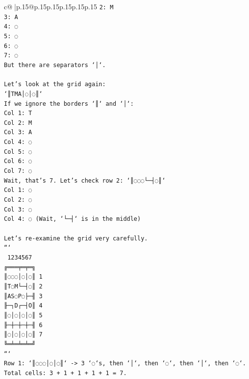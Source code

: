 \documentclass{article}
\begin{document}
{\begin{supertabular}{c@{$\;$}|p{.15\linewidth}@{}p{.15\linewidth}p{.15\linewidth}p{.15\linewidth}p{.15\linewidth}p{.15\linewidth}}
{{{\texttt{2: M} \\
\texttt{3: A} \\
\texttt{4: ◌} \\
\texttt{5: ◌} \\
\texttt{6: ◌} \\
\texttt{7: ◌} \\
\texttt{But there are separators `│`.} \\
\\ 
\texttt{Let's look at the grid again:} \\
\texttt{`║TMA│◌│◌║`} \\
\texttt{If we ignore the borders `║` and `│`:} \\
\texttt{Col 1: T} \\
\texttt{Col 2: M} \\
\texttt{Col 3: A} \\
\texttt{Col 4: ◌} \\
\texttt{Col 5: ◌} \\
\texttt{Col 6: ◌} \\
\texttt{Col 7: ◌} \\
\texttt{Wait, that's 7. Let's check row 2: `║◌◌◌└─┤◌║`} \\
\texttt{Col 1: ◌} \\
\texttt{Col 2: ◌} \\
\texttt{Col 3: ◌} \\
\texttt{Col 4: ◌ (Wait, `└─┤` is in the middle)} \\
\\ 
\texttt{Let's re{-}examine the grid very carefully.} \\
\texttt{```} \\
\texttt{ 1234567} \\
\texttt{╔═══╤═╤═╗} \\
\texttt{║◌◌◌│◌│◌║ 1} \\
\texttt{║T◌M└─┤◌║ 2} \\
\texttt{║AS◌P◌├─╢ 3} \\
\texttt{╟─┐D┌─┤O║ 4} \\
\texttt{║◌│◌│◌│◌║ 5} \\
\texttt{╟─┼─┼─┼─╢ 6} \\
\texttt{║◌│◌│◌│◌║ 7} \\
\texttt{╚═╧═╧═╧═╝} \\
\texttt{```} \\
\texttt{Row 1: `║◌◌◌│◌│◌║` {-}> 3 `◌`s, then `│`, then `◌`, then `│`, then `◌`.} \\
\texttt{Total cells: 3 + 1 + 1 + 1 + 1 = 7.} \\
}}}
\end{supertabular}}
\end{document}
